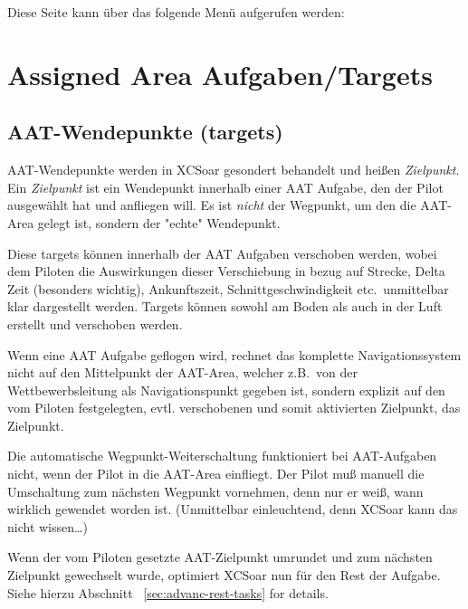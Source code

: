 Diese Seite kann über das folgende Menü aufgerufen werden:
\begin{center}
\blink{}\blink{}
\end{center}

\section{Assigned Area Aufgaben/Targets}\label{sec:aat-tasks}
\subsection*{AAT-Wendepunkte (targets)}

AAT-Wendepunkte werden in \textsf{XCSoar} gesondert behandelt und heißen  \textcolor[rgb]{0.00,0.00,0.50}{{\em Zielpunkt}}. Ein  {\em Zielpunkt } ist ein Wendepunkt innerhalb einer AAT Aufgabe, den der Pilot ausgewählt hat und anfliegen will. Es ist \textsl{nicht} der Wegpunkt, um den die AAT-Area gelegt ist, sondern der "echte" Wendepunkt.

Diese targets können innerhalb der AAT Aufgaben verschoben werden, wobei dem Piloten die Auswirkungen dieser Verschiebung in bezug auf Strecke, Delta Zeit (besonders wichtig), Ankunftszeit, Schnittgeschwindigkeit etc.\ unmittelbar klar dargestellt werden.  Targets können sowohl am Boden als auch in der Luft erstellt und verschoben werden.

Wenn eine AAT Aufgabe geflogen wird, rechnet das komplette Navigationssystem nicht auf den Mittelpunkt der AAT-Area, welcher z.B.\ von der Wettbewerbsleitung als Navigationspunkt gegeben ist, sondern explizit auf den vom Piloten festgelegten, evtl. verschobenen und  somit aktivierten Zielpunkt, das Zielpunkt.

Die automatische Wegpunkt-Weiterschaltung  funktioniert bei AAT-Aufgaben nicht, wenn der Pilot in die AAT-Area einfliegt. Der Pilot muß manuell  die Umschaltung zum nächsten Wegpunkt vornehmen, denn nur er weiß, wann wirklich gewendet worden ist. (Unmittelbar einleuchtend, denn \textsf{XCSoar} kann das nicht wissen\dots)

Wenn der vom Piloten gesetzte AAT-Zielpunkt umrundet und zum nächsten Zielpunkt gewechselt wurde, optimiert \textsf{XCSoar} nun für den Rest der Aufgabe. Siehe hierzu Abschnitt ~\ref{sec:advanc-rest-tasks} for details.


